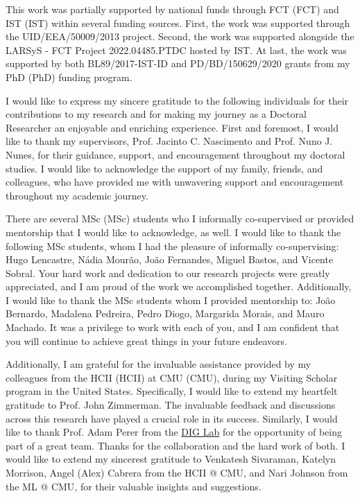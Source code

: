 
This work was partially supported by national funds through \acl{FCT} (\acs{FCT}) and \acl{IST} (\acs{IST}) within several funding sources.
First, the work was supported through the UID/EEA/50009/2013 project.
Second, the work was supported alongside the LARSyS - \acs{FCT} Project 2022.04485.PTDC hosted by \acs{IST}.
At last, the work was supported by both BL89/2017-\acs{IST}-ID and PD/BD/150629/2020 grants from my \acl{PhD} (\acs{PhD}) funding program.

I would like to express my sincere gratitude to the following individuals for their contributions to my research and for making my journey as a Doctoral Researcher an enjoyable and enriching experience.
First and foremost, I would like to thank my supervisors, Prof. Jacinto C. Nascimento and Prof. Nuno J. Nunes, for their guidance, support, and encouragement throughout my doctoral studies.
I would like to acknowledge the support of my family, friends, and colleagues, who have provided me with unwavering support and encouragement throughout my academic journey.

There are several \acl{MSc} (\acs{MSc}) students who I informally co-supervised or provided mentorship that I would like to acknowledge, as well.
I would like to thank the following \acs{MSc} students, whom I had the pleasure of informally co-supervising: Hugo Lencastre, N\'{a}dia Mour\~{a}o, Jo\~{a}o Fernandes, Miguel Bastos, and Vicente Sobral.
Your hard work and dedication to our research projects were greatly appreciated, and I am proud of the work we accomplished together.
Additionally, I would like to thank the \acs{MSc} students whom I provided mentorship to: Jo\~{a}o Bernardo, Madalena Pedreira, Pedro Diogo, Margarida Morais, and Mauro Machado.
It was a privilege to work with each of you, and I am confident that you will continue to achieve great things in your future endeavors.

Additionally, I am grateful for the invaluable assistance provided by my colleagues from the \acl{HCII} (\acs{HCII}) at \acl{CMU} (\acs{CMU}), during my Visiting Scholar program in the United States.
Specifically, I would like to extend my heartfelt gratitude to Prof. John Zimmerman.
The invaluable feedback and discussions across this research have played a crucial role in its success.
Similarly, I would like to thank Prof. Adam Perer from the \href{https://dig.cmu.edu/}{DIG Lab} for the opportunity of being part of a great team.
Thanks for the collaboration and the hard work of both.
I would like to extend my sincerest gratitude to Venkatesh Sivaraman, Katelyn Morrison, Angel (Alex) Cabrera from the \acs{HCII} @ \acs{CMU}, and Nari Johnson from the \acs{ML} @ \acs{CMU}, for their valuable insights and suggestions.

